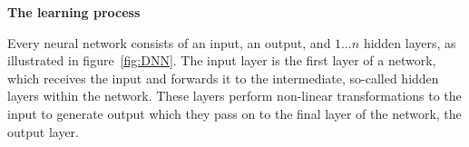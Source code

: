 \textbf{The learning process}

Every neural network consists of an input, an output, and $1\dots n$ hidden layers, as illustrated in figure~\ref{fig:DNN}.
The input layer is the first layer of a network, which receives the input and forwards it to the intermediate, so-called hidden layers within the network. These layers perform non-linear transformations to the input to generate output which they pass on to the final layer of the network, the output layer. 
\begin{figure}
\centering
{} %
\begin{tikzpicture}[x=0.75pt,y=0.75pt,yscale=-1.5,xscale=1.5]


\end{tikzpicture}
\end{figure}
